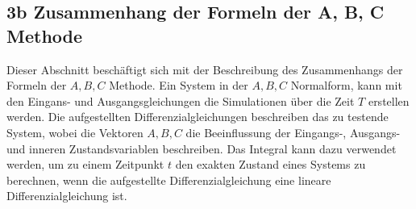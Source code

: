 \documentclass[11pt, a4paper, twoside]{article}   	%
\begin{document}
\subsection{3b Zusammenhang der Formeln der A, B, C Methode}
Dieser Abschnitt beschäftigt sich mit der Beschreibung des Zusammenhangs der Formeln der $A, B, C$ Methode.
\newline
\newline
Ein System in der $A, B, C$ Normalform, kann mit den Eingans- und Ausgangsgleichungen die Simulationen über die Zeit $T$ erstellen werden. Die aufgestellten Differenzialgleichungen beschreiben das zu testende System, wobei die Vektoren $A, B, C$ die Beeinflussung der Eingangs-, Ausgangs- und inneren Zustandsvariablen beschreiben. Das Integral kann dazu verwendet werden, um zu einem Zeitpunkt $t$ den exakten Zustand eines Systems zu berechnen, wenn die aufgestellte Differenzialgleichung eine lineare Differenzialgleichung ist. 
\end{document}
